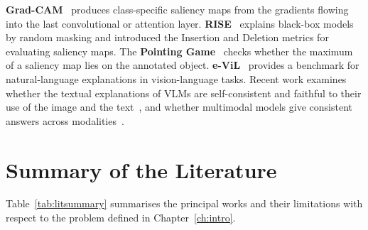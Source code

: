 \documentclass[12pt,a4paper,oneside]{report}
\begin{document}
\textbf{Grad-CAM}~\cite{selvaraju2017gradcam} produces class-specific saliency
maps from the gradients flowing into the last convolutional or attention layer.
\textbf{RISE}~\cite{petsiuk2018rise} explains black-box models by random masking
and introduced the Insertion and Deletion metrics for evaluating saliency maps.
The \textbf{Pointing Game}~\cite{zhang2018excitation} checks whether the
maximum of a saliency map lies on the annotated object.
\textbf{e-ViL}~\cite{kayser2021evil} provides a benchmark for natural-language
explanations in vision-language tasks. Recent work examines whether the textual
explanations of VLMs are self-consistent and faithful to their use of the image
and the text~\cite{parcalabescu2025faithfulness}, and whether multimodal models
give consistent answers across modalities~\cite{zhang2024crossmodal}.

\section{Summary of the Literature}

Table~\ref{tab:litsummary} summarises the principal works and their limitations
with respect to the problem defined in Chapter~\ref{ch:intro}.
\end{document}
